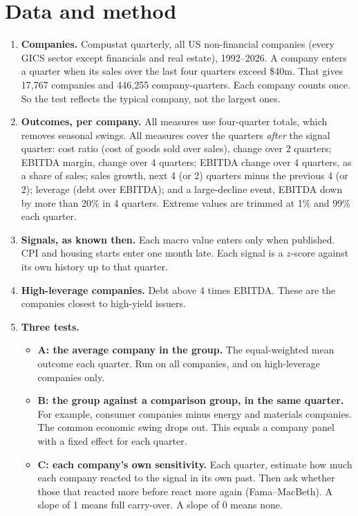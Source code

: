\documentclass[11pt,a4paper]{article}
\begin{document}
\section{Data and method}
\begin{enumerate}
\item \textbf{Companies.} Compustat quarterly, all US non-financial companies (every GICS sector except financials and real estate), 1992--2026. A company enters a quarter when its sales over the last four quarters exceed \$40m. That gives 17,767 companies and 446,255 company-quarters. Each company counts once. So the test reflects the typical company, not the largest ones.
\item \textbf{Outcomes, per company.} All measures use four-quarter totals, which removes seasonal swings. All measures cover the quarters \emph{after} the signal quarter:
cost ratio (cost of goods sold over sales), change over 2 quarters; EBITDA margin, change over 4 quarters; EBITDA change over 4 quarters, as a share of sales; sales growth, next 4 (or 2) quarters minus the previous 4 (or 2); leverage (debt over EBITDA); and a large-decline event, EBITDA down by more than 20\% in 4 quarters. Extreme values are trimmed at 1\% and 99\% each quarter.
\item \textbf{Signals, as known then.} Each macro value enters only when published. CPI and housing starts enter one month late. Each signal is a $z$-score against its own history up to that quarter.
\item \textbf{High-leverage companies.} Debt above 4 times EBITDA. These are the companies closest to high-yield issuers.
\item \textbf{Three tests.}
\begin{itemize}
\item \textbf{A: the average company in the group.} The equal-weighted mean outcome each quarter. Run on all companies, and on high-leverage companies only.
\item \textbf{B: the group against a comparison group, in the same quarter.} For example, consumer companies minus energy and materials companies. The common economic swing drops out. This equals a company panel with a fixed effect for each quarter.
\item \textbf{C: each company's own sensitivity.} Each quarter, estimate how much each company reacted to the signal in its own past. Then ask whether those that reacted more before react more again (Fama--MacBeth). A slope of 1 means full carry-over. A slope of 0 means none.
\end{itemize}

\end{enumerate}
\end{document}
